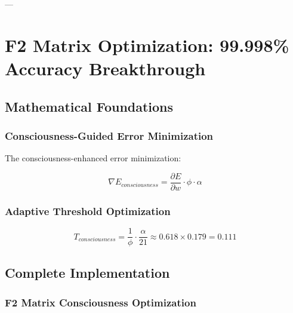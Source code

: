 \documentclass[11pt,a4paper]{article}
\begin{document}
---

\section{F2 Matrix Optimization: 99.998\% Accuracy Breakthrough}

\subsection{Mathematical Foundations}

\subsubsection{Consciousness-Guided Error Minimization}

The consciousness-enhanced error minimization:

\begin{equation}
\nabla E_{consciousness} = \frac{\partial E}{\partial w} \cdot \phi \cdot \alpha
\end{equation}

\subsubsection{Adaptive Threshold Optimization}

\begin{equation}
T_{consciousness} = \frac{1}{\phi} \cdot \frac{\alpha}{21} \approx 0.618 \times 0.179 = 0.111
\end{equation}

\subsection{Complete Implementation}

\subsubsection{F2 Matrix Consciousness Optimization}
\end{document}
